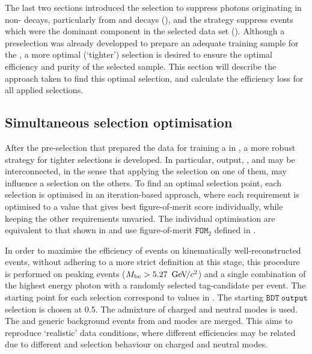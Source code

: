 The last two sections introduced the selection to suppress photons originating in non-\mbox{\BtoXsgamma} decays, particularly from \piz and \eta decays (),
and the strategy suppress \mbox{\epem\ra\qqbar} events which were the dominant component in the selected data set ().
Although a preselection was already developped to prepare an adequate training sample for the \BDT, a more optimal (`tighter') selection is desired to ensure the optimal efficiency and purity of the selected sample.
This section will describe the approach taken to find this optimal selection, and calculate the efficiency loss for all applied selections.

\subsection{Simultaneous selection optimisation}\label{sec:simultaneous_optimisation}

After the pre-selection that prepared the data for training a \BDT in , a more robust strategy for tighter selections is developed.
In particular, \BDT output, \piVeto, \etaVeto and \ZMVA may be interconnected, in the sense that applying the selection on one of them, may influence a selection on the others. 
To find an optimal selection point, each selection is optimised in an iteration-based approach, 
where each requirement is optimised to a value that gives best figure-of-merit score individually,
while keeping the other requirements unvaried.
The individual optimisation are equivalent to that shown in  and use figure-of-merit $\mathtt{FOM}_2$ defined in .


In order to maximise the efficiency of events on kinematically well-reconstructed events, without adhering to a more strict definition at this stage, 
this procedure is performed on peaking events (${M_{\mathrm{bc}}} >5.27~{\mathrm{\,Ge\kern -0.1em V\!/}c^2}$) and a single combination of the highest energy photon with a randomly selected tag-candidate per event.
The starting point for each selection correspond to values in .
The starting $\mathtt{BDT~output}$ selection is chosen at 0.5. 
The \BtoXsgamma admixture of charged and neutral modes is used.
The \epem\ra\qqbar and generic \BB background events from \feiBp and \feiBz modes are merged.
This aims to reproduce `realistic' data conditions, where different efficiencies may be related due to different \FEI and selection behaviour on charged and neutral modes.

